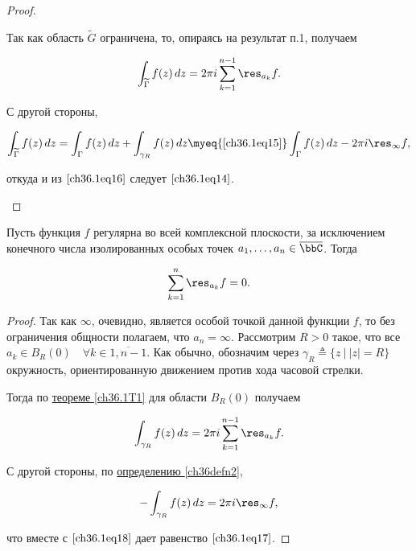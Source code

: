 \begin{proof}
\begin{enumerate}
Так как область $\widetilde{G}$ ограничена, то, опираясь на результат п.1, получаем

\begin{equation} \label{ch36.1eq16}
\int_{\widetilde{\Gamma}} f(z) \,dz = 2\pi i \sum_{k = 1}^{n - 1} \res_{a_k} f.
\end{equation}
 
С другой стороны,

$$
\int_{\widetilde{\Gamma}} f(z) \,dz = \int_{\Gamma} f(z) \,dz + \int_{\gamma_R} f(z) \,dz \myeq{\eqref{ch36.1eq15}} \int_{\Gamma} f(z) \,dz - 2\pi i\res_{\infty} f,
$$

откуда и из $\eqref{ch36.1eq16}$ следует $\eqref{ch36.1eq14}$.	

\end{enumerate}
\end{proof}

\begin{cons}
Пусть функция $f$ регулярна во всей комплексной плоскости, за исключением конечного числа изолированных особых точек $a_1,\ldots,a_n \in \overline{\bbC}$. Тогда

\begin{equation} \label{ch36.1eq17}
\sum_{k = 1}^{n} \res_{a_k} f = 0.
\end{equation}
\end{cons}

\begin{proof}
Так как $\infty$, очевидно, является особой точкой данной функции $f$, то без ограничения общности полагаем, что $a_n = \infty$. Рассмотрим $R > 0$ такое, что все $a_k \in B_R(0) \quad \forall k \in \overline{1, n - 1}$. Как обычно, обозначим через $\gamma_R \triangleq \{ z \: \big| \: |z| = R\}$ окружность, ориентированную движением против хода часовой стрелки.

Тогда по \hyperref[ch36.1T1]{теореме \ref{ch36.1T1}} для области $B_R(0)$ получаем

\begin{equation} \label{ch36.1eq18}
\int_{\gamma_R} f(z) \,dz = 2\pi i \sum_{k = 1}^{n - 1} \res_{a_k} f.
\end{equation}

С другой стороны, по \hyperref[ch36defn2]{определению \ref{ch36defn2}},

$$
- \int_{\gamma_R} f(z) \,dz = 2\pi i \res_{\infty} f,
$$

что вместе с $\eqref{ch36.1eq18}$ дает равенство $\eqref{ch36.1eq17}$.
\end{proof}

